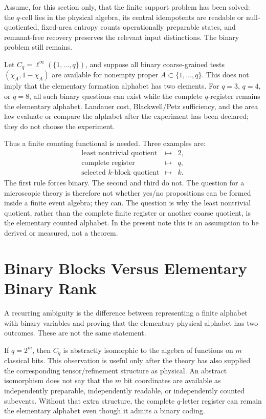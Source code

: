 \documentclass[12pt]{article}
\theoremstyle{definition}
\theoremstyle{remark}
\begin{document}
Assume, for this section only, that the finite support problem has been solved:
the \(q\)-cell lies in the physical algebra, its central idempotents are
readable or null-quotiented, fixed-area entropy counts operationally preparable
states, and remnant-free recovery preserves the relevant input distinctions.
The binary problem still remains.

Let \(C_q=\ell^\infty(\{1,\ldots,q\})\), and suppose all binary coarse-grained
tests \((\chi_A,1-\chi_A)\) are available for nonempty proper
\(A\subset\{1,\ldots,q\}\).  This does not imply that the elementary formation
alphabet has two elements.  For \(q=3\), \(q=4\), or \(q=8\), all such binary
questions can exist while the complete \(q\)-register remains the elementary
alphabet.  Landauer cost, Blackwell/Petz sufficiency, and the area law evaluate
or compare the alphabet after the experiment has been declared; they do not
choose the experiment.

Thus a finite counting functional is needed.  Three examples are:
\[
\begin{array}{ccc}
\text{least nontrivial quotient} &\mapsto& 2,\\
\text{complete register} &\mapsto& q,\\
\text{selected } k\text{-block quotient} &\mapsto& k.
\end{array}
\]
The first rule forces binary.  The second and third do not.  The question for a
microscopic theory is therefore not whether yes/no propositions can be formed
inside a finite event algebra; they can.  The question is why the least
nontrivial quotient, rather than the complete finite register or another
coarse quotient, is the elementary counted alphabet.  In the present note this
is an assumption to be derived or measured, not a theorem.

\section{Binary Blocks Versus Elementary Binary Rank}

A recurring ambiguity is the difference between representing a finite alphabet
with binary variables and proving that the elementary physical alphabet has
two outcomes.  These are not the same statement.

If \(q=2^m\), then \(C_q\) is abstractly isomorphic to the algebra of functions
on \(m\) classical bits.  This observation is useful only after the theory has
also supplied the corresponding tensor/refinement structure as physical.  An
abstract isomorphism does not say that the \(m\) bit coordinates are available
as independently preparable, independently readable, or independently counted
subevents.  Without that extra structure, the complete \(q\)-letter register
can remain the elementary alphabet even though it admits a binary coding.
\end{document}
